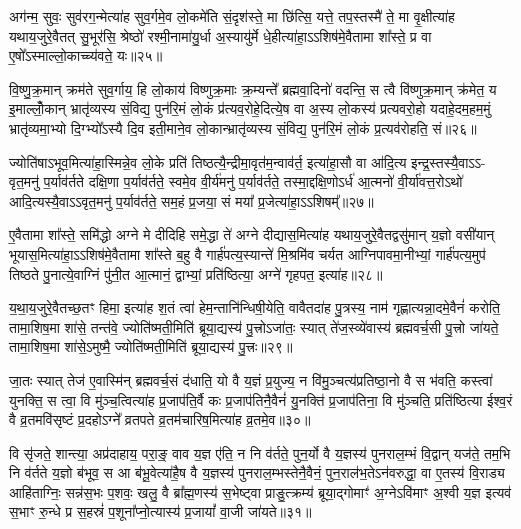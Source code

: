 {\anuvakamend[{इत्ये॒तद॑वभृ॒थो दिशः॑ स॒प्त च॑॥५॥}]}

अग॑न्म॒ सुवः॒ सुव॑रग॒न्मेत्या॑ह सुव॒र्गमे॒व लो॒कमे॑ति सं॒दृश॑स्ते॒ मा छि॑त्सि॒ यत्ते॒ तप॒स्तस्मै॑ ते॒ मा वृ॒क्षीत्या॑ह यथाय॒जुरे॒वैतत् सु॒भूर॑सि॒ श्रेष्ठो॑ रश्मी॒नामा॑यु॒र्धा अ॒स्यायु॑र्मे धे॒हीत्या॑हा॒\-ऽ\-ऽशिष॑मे॒वैतामा शा᳚स्ते॒ प्र वा ए॒षो᳚\-ऽस्माल्लो॒काच्च्य॑वते॒ यः॥२५॥

वि॒ष्णु॒क्र॒मान् क्रम॑ते सुव॒र्गाय॒ हि लो॒काय॑ विष्णुक्र॒माः क्र॒म्यन्ते᳚ ब्रह्मवा॒दिनो॑ वदन्ति॒ स त्वै वि॑ष्णुक्र॒मान् क्र॑मेत॒ य इ॒माल्लोँ॒कान् भ्रातृ॑व्यस्य सं॒विद्य॒ पुन॑रि॒मं लो॒कं प्र॑त्यव॒रोहे॒दित्ये॒ष वा अ॒स्य लो॒कस्य॑ प्रत्यवरो॒हो यदाहे॒दम॒हम॒मुं भ्रातृ॑व्यमा॒भ्यो दि॒ग्भ्यो᳚\-ऽस्यै दि॒व इती॒माने॒व लो॒कान्भ्रातृ॑व्यस्य सं॒विद्य॒ पुन॑रि॒मं लो॒कं प्र॒त्यव॑रोहति॒ सं॥२६॥

ज्योति॑षा\-ऽभूव॒मित्या॑हा॒स्मिन्ने॒व लो॒के प्रति॑ तिष्ठत्यै॒न्द्रीमा॒वृत॑म॒न्वाव॑र्त॒ इत्या॑हा॒सौ वा आ॑दि॒त्य इन्द्र॒स्तस्यै॒वा\-ऽ\-ऽ- वृत॒मनु॑ प॒र्याव॑र्तते दक्षि॒णा प॒र्याव॑र्तते॒ स्वमे॒व वी॒र्य॑मनु॑ प॒र्याव॑र्तते॒ तस्मा॒द्दक्षि॒णो\-ऽर्ध॑ आ॒त्मनो॑ वी॒र्या॑वत्त॒रो\-ऽथो॑ आदि॒त्यस्यै॒वा\-ऽ\-ऽवृत॒मनु॑ प॒र्याव॑र्तते॒ सम॒हं प्र॒जया॒ सं मया᳚ प्र॒जेत्या॑हा॒\-ऽ\-ऽशिषम्᳚॥२७॥

ए॒वैतामा शा᳚स्ते॒ समि॑द्धो अग्ने मे दीदिहि समे॒द्धा ते॑ अग्ने दीद्यास॒मित्या॑ह यथाय॒जुरे॒वैतद्वसु॑मान् य॒ज्ञो वसी॑यान् भूयास॒मित्या॑हा॒\-ऽ\-ऽशिष॑मे॒वैतामा शा᳚स्ते ब॒हु वै गार्\mbox{}ह॑पत्य॒स्यान्ते॑ मि॒श्रमि॑व चर्यत आग्निपावमा॒नीभ्यां॒ गार्\mbox{}ह॑पत्य॒मुप॑ तिष्ठते पु॒नात्ये॒वाग्निं पु॑नी॒त आ॒त्मानं॒ द्वाभ्यां॒ प्रति॑ष्ठित्या॒ अग्ने॑ गृहपत॒ इत्या॑ह॥२८॥

य॒था॒य॒जुरे॒वैतच्छ॒तꣳ हिमा॒ इत्या॑ह श॒तं त्वा॑ हेम॒न्तानि॑न्धिषी॒येति॒ वावैतदा॑ह पु॒त्रस्य॒ नाम॑ गृह्णात्यन्ना॒दमे॒वैनं॑ करोति॒ तामा॒शिष॒मा शा॑से॒ तन्त॑वे॒ ज्योति॑ष्मती॒मिति॑ ब्रूया॒द्यस्य॑ पु॒त्त्रो\-ऽजा॑तः॒ स्यात् ते॑ज॒स्व्ये॑वास्य॑ ब्रह्मवर्च॒सी पु॒त्त्रो जा॑यते॒ तामा॒शिष॒मा शा॑से॒\-ऽमुष्मै॒ ज्योति॑ष्मती॒मिति॑ ब्रूया॒द्यस्य॑ पु॒त्त्रः॥२९॥

जा॒तः स्यात् तेज॑ ए॒वास्मि॑न् ब्रह्मवर्च॒सं द॑धाति॒ यो वै य॒ज्ञं प्र॒युज्य॒ न वि॑मु॒ञ्चत्य॑प्रतिष्ठा॒नो वै स भ॑वति॒ कस्त्वा॑ युनक्ति॒ स त्वा॒ वि मु॑ञ्च॒त्वित्या॑ह प्र॒जाप॑ति॒र्वै कः प्र॒जाप॑तिनै॒वैनं॑ यु॒नक्ति॑ प्र॒जाप॑तिना॒ वि मु॑ञ्चति॒ प्रति॑ष्ठित्या ईश्व॒रं वै व्र॒तमवि॑सृष्टं प्र॒दहो\-ऽग्ने᳚ व्रतपते व्र॒तम॑चारिष॒मित्या॑ह व्र॒तमे॒व॥३०॥

वि सृ॑जते॒ शान्त्या॒ अप्र॑दाहाय॒ परा॒ङ्॒ वाव य॒ज्ञ ए॑ति॒ न नि व॑र्तते॒ पुन॒र्यो वै य॒ज्ञस्य॑ पुनराल॒म्भं वि॒द्वान् यज॑ते॒ तम॒भि नि व॑र्तते य॒ज्ञो ब॑भूव॒ स आ ब॑भू॒वेत्या॑है॒ष वै य॒ज्ञस्य॑ पुनराल॒म्भस्तेनै॒वैनं॒ पुन॒राल॑भ॒ते\-ऽन॑वरुद्धा॒ वा ए॒तस्य॑ वि॒राड्य आहि॑ताग्निः॒ सन्न॑स॒भः प॒शवः॒ खलु॒ वै ब्रा᳚ह्म॒णस्य॑ स॒भेष्ट्वा प्राङु॒त्क्रम्य॑ ब्रूया॒द्गोमाꣳ॑ अ॒ग्ने\-ऽवि॑माꣳ अ॒श्वी य॒ज्ञ इत्यव॑ स॒भाꣳ रु॒न्धे प्र स॒हस्रं॑ प॒शूना᳚प्नो॒त्यास्य॑ प्र॒जायां᳚ वा॒जी जा॑यते॥३१॥

